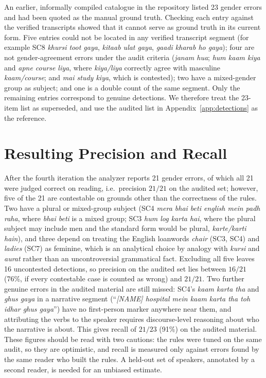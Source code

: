 \documentclass[11pt,a4paper]{report}
\begin{document}
An earlier, informally compiled catalogue in the repository listed 23 gender errors and had been quoted as the manual ground truth. Checking each entry against the verified transcripts showed that it cannot serve as ground truth in its current form. Five entries could not be located in any verified transcript segment (for example SC8 \textit{khursi toot gaya}, \textit{kitaab ulat gaya}, \textit{gaadi kharab ho gaya}); four are not gender-agreement errors under the audit criteria (\textit{janam hua}; \textit{hum kaam kiya} and \textit{apne course liya}, where \textit{kiya/liya} correctly agree with masculine \textit{kaam/course}; and \textit{mai study kiya}, which is contested); two have a mixed-gender group as subject; and one is a double count of the same segment. Only the remaining entries correspond to genuine detections. We therefore treat the 23-item list as superseded, and use the audited list in Appendix~\ref{app:detections} as the reference.

\section{Resulting Precision and Recall}

After the fourth iteration the analyzer reports 21 gender errors, of which all 21 were judged correct on reading, i.e.\ precision $21/21$ on the audited set; however, five of the 21 are contestable on grounds other than the correctness of the rules. Two have a plural or mixed-group subject (SC4 \textit{mera bhai beti english mein padh raha}, where \textit{bhai beti} is a mixed group; SC3 \textit{hum log karta hai}, where the plural subject may include men and the standard form would be plural, \textit{karte/karti hain}), and three depend on treating the English loanwords \textit{chair} (SC3, SC4) and \textit{ladies} (SC7) as feminine, which is an analytical choice by analogy with \textit{kursi} and \textit{aurat} rather than an uncontroversial grammatical fact. Excluding all five leaves 16 uncontested detections, so precision on the audited set lies between $16/21$ (76\%, if every contestable case is counted as wrong) and $21/21$. Two further genuine errors in the audited material are still missed: SC4's \textit{kaam karta tha} and \textit{ghus gaya} in a narrative segment (``\textit{[NAME] hospital mein kaam karta tha toh idhar ghus gaya}'') have no first-person marker anywhere near them, and attributing the verbs to the speaker requires discourse-level reasoning about who the narrative is about. This gives recall of $21/23$ (91\%) on the audited material. These figures should be read with two cautions: the rules were tuned on the same audit, so they are optimistic, and recall is measured only against errors found by the same reader who built the rules. A held-out set of speakers, annotated by a second reader, is needed for an unbiased estimate.
\end{document}

